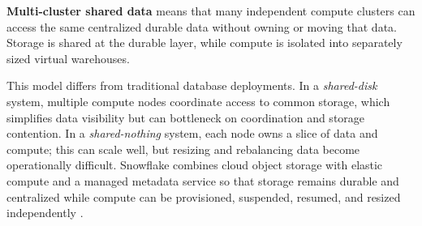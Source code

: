 \begin{definitionbox}
\textbf{Multi-cluster shared data} means that many independent compute clusters can access the same centralized durable data without owning or moving that data. Storage is shared at the durable layer, while compute is isolated into separately sized virtual warehouses.
\end{definitionbox}

This model differs from traditional database deployments. In a \emph{shared-disk} system, multiple compute nodes coordinate access to common storage, which simplifies data visibility but can bottleneck on coordination and storage contention. In a \emph{shared-nothing} system, each node owns a slice of data and compute; this can scale well, but resizing and rebalancing data become operationally difficult. Snowflake combines cloud object storage with elastic compute and a managed metadata service so that storage remains durable and centralized while compute can be provisioned, suspended, resumed, and resized independently \cite{dageville2016snowflake}.

